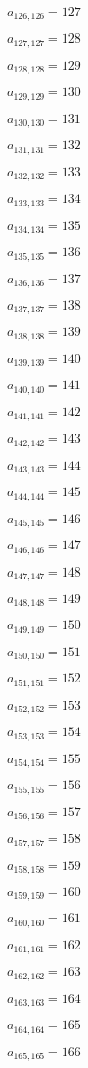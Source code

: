 \documentclass[a4paper,12pt]{article}
\begin{document}
$a _{ 126, 126 } = 127$

$a _{ 127, 127 } = 128$

$a _{ 128, 128 } = 129$

$a _{ 129, 129 } = 130$

$a _{ 130, 130 } = 131$

$a _{ 131, 131 } = 132$

$a _{ 132, 132 } = 133$

$a _{ 133, 133 } = 134$

$a _{ 134, 134 } = 135$

$a _{ 135, 135 } = 136$

$a _{ 136, 136 } = 137$

$a _{ 137, 137 } = 138$

$a _{ 138, 138 } = 139$

$a _{ 139, 139 } = 140$

$a _{ 140, 140 } = 141$

$a _{ 141, 141 } = 142$

$a _{ 142, 142 } = 143$

$a _{ 143, 143 } = 144$

$a _{ 144, 144 } = 145$

$a _{ 145, 145 } = 146$

$a _{ 146, 146 } = 147$

$a _{ 147, 147 } = 148$

$a _{ 148, 148 } = 149$

$a _{ 149, 149 } = 150$

$a _{ 150, 150 } = 151$

$a _{ 151, 151 } = 152$

$a _{ 152, 152 } = 153$

$a _{ 153, 153 } = 154$

$a _{ 154, 154 } = 155$

$a _{ 155, 155 } = 156$

$a _{ 156, 156 } = 157$

$a _{ 157, 157 } = 158$

$a _{ 158, 158 } = 159$

$a _{ 159, 159 } = 160$

$a _{ 160, 160 } = 161$

$a _{ 161, 161 } = 162$

$a _{ 162, 162 } = 163$

$a _{ 163, 163 } = 164$

$a _{ 164, 164 } = 165$

$a _{ 165, 165 } = 166$
\end{document}
